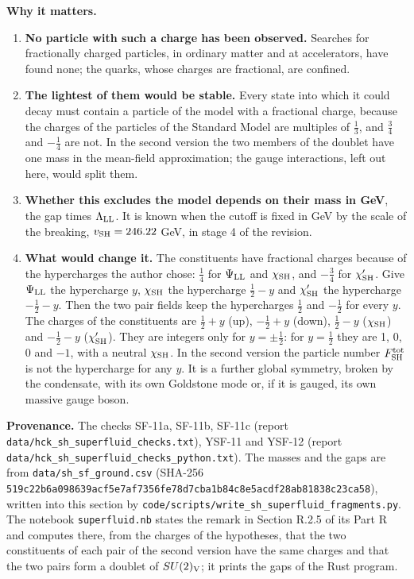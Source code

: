 \documentclass[
  10pt,
]{article}
\providecommand{\tightlist}{%
  \setlength{\itemsep}{0pt}\setlength{\parskip}{0pt}}
\begin{document}
\textbf{Why it matters.}

\begin{enumerate}
\def\labelenumi{\arabic{enumi}.}
\tightlist
\item
  \textbf{No particle with such a charge has been observed.} Searches
  for fractionally charged particles, in ordinary matter and at
  accelerators, have found none; the quarks, whose charges are
  fractional, are confined.
\item
  \textbf{The lightest of them would be stable.} Every state into which
  it could decay must contain a particle of the model with a fractional
  charge, because the charges of the particles of the Standard Model are
  multiples of \(\tfrac13\), and \(\tfrac34\) and \(-\tfrac14\) are not.
  In the second version the two members of the doublet have one mass in
  the mean-field approximation; the gauge interactions, left out here,
  would split them.
\item
  \textbf{Whether this excludes the model depends on their mass in GeV},
  the gap times \(\Lambda_{\rm LL}\). It is known when the cutoff is
  fixed in GeV by the scale of the breaking, \(v_{\rm SH}=246.22\) GeV,
  in stage 4 of the revision.
\item
  \textbf{What would change it.} The constituents have fractional
  charges because of the hypercharges the author chose: \(\tfrac14\) for
  \(\Psi_{\rm LL}\) and \(\chi_{\rm SH}\), and \(-\tfrac34\) for
  \(\chi'_{\rm SH}\). Give \(\Psi_{\rm LL}\) the hypercharge \(y\),
  \(\chi_{\rm SH}\) the hypercharge \(\tfrac12-y\) and
  \(\chi'_{\rm SH}\) the hypercharge \(-\tfrac12-y\). Then the two pair
  fields keep the hypercharges \(\tfrac12\) and \(-\tfrac12\) for every
  \(y\). The charges of the constituents are \(\tfrac12+y\) (up),
  \(-\tfrac12+y\) (down), \(\tfrac12-y\) (\(\chi_{\rm SH}\)) and
  \(-\tfrac12-y\) (\(\chi'_{\rm SH}\)). They are integers only for
  \(y=\pm\tfrac12\): for \(y=\tfrac12\) they are 1, 0, 0 and \(-1\),
  with a neutral \(\chi_{\rm SH}\). In the second version the particle
  number \(F^{\rm tot}_{\rm SH}\) is not the hypercharge for any \(y\).
  It is a further global symmetry, broken by the condensate, with its
  own Goldstone mode or, if it is gauged, its own massive gauge boson.
\end{enumerate}

\textbf{Provenance.} The checks SF-11a, SF-11b, SF-11c (report
\texttt{data/hck\_sh\_superfluid\_checks.txt}), YSF-11 and YSF-12
(report \texttt{data/hck\_sh\_superfluid\_checks\_python.txt}). The
masses and the gaps are from \texttt{data/sh\_sf\_ground.csv} (SHA-256
\texttt{519c22b6a098639acf5e7af7356fe78d7cba1b84c8e5acdf28ab81838c23ca58}),
written into this section by
\texttt{code/scripts/write\_sh\_superfluid\_fragments.py}. The notebook
\texttt{superfluid.nb} states the remark in Section R.2.5 of its Part R
and computes there, from the charges of the hypotheses, that the two
constituents of each pair of the second version have the same charges
and that the two pairs form a doublet of \(SU(2)_{\rm V}\); it prints
the gaps of the Rust program.
\end{document}
